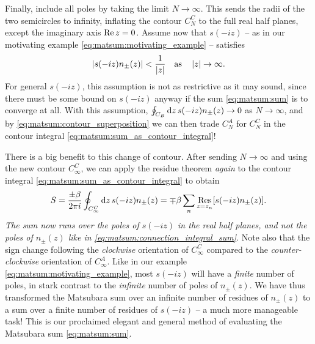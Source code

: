 Finally, include all poles by taking the limit $N \rightarrow \infty$.
This sends the radii of the two semicircles to infinity, inflating the contour $C_N^C$ to the full real half planes, except the imaginary axis $\operatorname{Re} z = 0$.
Assume now that $s(-i z)$ -- as in our motivating example \eqref{eq:matsum:motivating_example} -- satisfies
\begin{equation}
	\left\lvert s(-iz) n_\pm(z) \right\rvert < \frac{1}{\left\lvert z \right\rvert} \quad \text{as} \quad \left\lvert z \right\rvert \rightarrow \infty .
\end{equation}
For general $s(-iz)$, this assumption is not as restrictive as it may sound, since there must be some bound on $s(-iz)$ anyway if the sum \eqref{eq:matsum:sum} is to converge at all.
With this assumption, $\oint_{C_B} \mathop{}\!\mathrm{d} z \, s(-iz) n_\pm(z) \rightarrow 0$ as $N \rightarrow \infty$, and by \cref{eq:matsum:contour_superposition} we can then trade $C_N^A$ for $C_N^C$ in the contour integral \eqref{eq:matsum:sum_as_contour_integral}!

There is a big benefit to this change of contour.
After sending $N \rightarrow \infty$ and using the new contour $C_\infty^C$, we can apply the residue theorem \emph{again} to the contour integral \eqref{eq:matsum:sum_as_contour_integral} to obtain
\begin{equation}
	S = \frac{\pm \beta}{2 \pi i} \oint_{C_\infty^C} \mathop{}\!\mathrm{d} z \, s(-iz) n_\pm(z) = \mp \beta \sum_n \operatorname*{Res}_{z=z_n} [s(-iz) n_\pm(z)] .
\label{eq:matsum:sum_finite_residues}
\end{equation}
\emph{The sum now runs over the poles of $s(-iz)$ in the real half planes, and not the poles of $n_\pm(z)$ like in \cref{eq:matsum:connection_integral_sum}}.
Note also that the sign change following the \emph{clockwise} orientation of $C_\infty^C$ compared to the \emph{counter-clockwise} orientation of $C_\infty^A$.
Like in our example \eqref{eq:matsum:motivating_example}, most $s(-iz)$ will have a \emph{finite} number of poles, in stark contrast to the \emph{infinite} number of poles of $n_\pm(z)$.
We have thus transformed the Matsubara sum over an infinite number of residues of $n_\pm(z)$ to a sum over a finite number of residues of $s(-iz)$ -- a much more manageable task!
This is our proclaimed elegant and general method of evaluating the Matsubara sum \eqref{eq:matsum:sum}.

